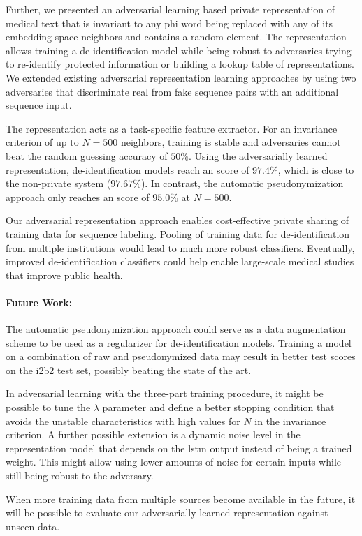 %
Further, we presented an adversarial learning based private representation of medical text that is invariant to any \ac{phi} word being replaced with any of its embedding space neighbors and contains a random element.
%
The representation allows training a de-identification model while being robust to adversaries trying to re-identify protected information or building a lookup table of representations.
%
We extended existing adversarial representation learning approaches by using two adversaries that discriminate real from fake sequence pairs with an additional sequence input.

%
The representation acts as a task-specific feature extractor.
%
For an invariance criterion of up to $N=500$ neighbors, training is stable and adversaries cannot beat the random guessing accuracy of $50\%$.
%
Using the adversarially learned representation, de-identification models reach an \fone score of $97.4\%$, which is close to the non-private system (\(97.67\%\)).
In contrast, the automatic pseudonymization approach only reaches an \fone score of \(95.0\%\) at \(N = 500\).
%
% 

%
Our adversarial representation approach enables cost-effective private sharing of training data for sequence labeling. Pooling of training data for de-identification from multiple institutions would lead to much more robust classifiers.
%
Eventually, improved de-identification classifiers could help enable large-scale medical studies that improve public health.

%
\paragraph{Future Work:} The automatic pseudonymization approach could serve as a data augmentation scheme to be used as a regularizer for de-identification models.
%
Training a model on a combination of raw and pseudonymized data may result in better test scores on the i2b2 test set, possibly beating the state of the art.

%
In adversarial learning with the three-part training procedure, it might be possible to tune the $\lambda$ parameter and define a better stopping condition that avoids the unstable characteristics with high values for $N$ in the invariance criterion.
%
A further possible extension is a dynamic noise level in the representation model that depends on the \ac{lstm} output instead of being a trained weight.
%
This might allow using lower amounts of noise for certain inputs while still being robust to the adversary.

%
When more training data from multiple sources become available in the future, it will be possible to evaluate our adversarially learned representation against unseen data.


